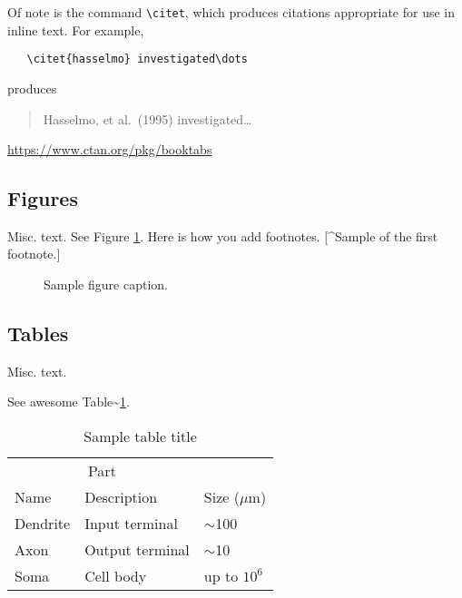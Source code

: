 \documentclass{article}
\begin{document}
Of note is the command \verb+\citet+, which produces citations
appropriate for use in inline text. For example,

\begin{verbatim}
   \citet{hasselmo} investigated\dots
\end{verbatim}

produces

\begin{quote}
  Hasselmo, et al.\ (1995) investigated\dots
\end{quote}

\begin{center}
  \url{https://www.ctan.org/pkg/booktabs}
\end{center}

\hypertarget{figures}{%
\subsection{Figures}\label{figures}}

Misc. text. See Figure \ref{fig:fig1}. Here is how you add footnotes.
{[}\^{}Sample of the first footnote.{]}

\begin{figure}
  \centering
  \fbox{\rule[-.5cm]{4cm}{4cm} \rule[-.5cm]{4cm}{0cm}}
  \caption{Sample figure caption.}
  \label{fig:fig1}
\end{figure}

\hypertarget{tables}{%
\subsection{Tables}\label{tables}}

Misc. text.

See awesome Table\textasciitilde{}\ref{tab:table}.

\begin{table}
 \caption{Sample table title}
  \centering
  \begin{tabular}{lll}
    \toprule
    \multicolumn{2}{c}{Part}                   \\
    \cmidrule(r){1-2}
    Name     & Description     & Size ($\mu$m) \\
    \midrule
    Dendrite & Input terminal  & $\sim$100     \\
    Axon     & Output terminal & $\sim$10      \\
    Soma     & Cell body       & up to $10^6$  \\
    \bottomrule
  \end{tabular}
  \label{tab:table}
\end{table}
\end{document}
